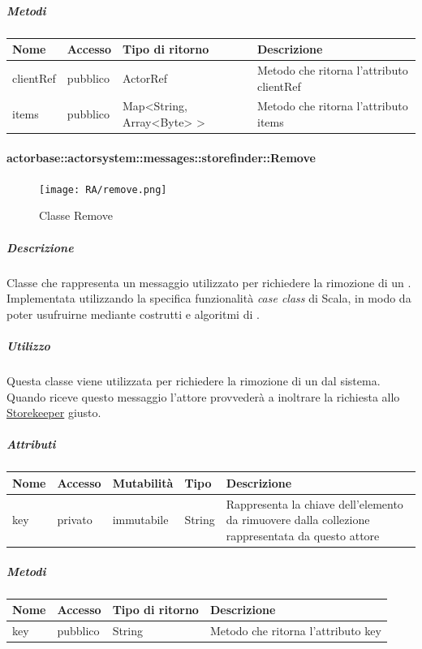 \documentclass{scalatekids-article}
\begin{document}
\subparagraph{Metodi}
\begin{tabular}{| p{3cm} | p{1.5cm} | p{3.5cm} | p{9cm} |}
  \hline
  Nome & Accesso & Tipo di ritorno & Descrizione\\
  \hline
  clientRef & pubblico & ActorRef & Metodo che ritorna l'attributo clientRef\\
  \hline
  items & pubblico & Map<String, Array<Byte> > & Metodo che ritorna l'attributo items\\
  \hline
\end{tabular}

\paragraph{actorbase::actorsystem::messages::storefinder::Remove}
\label{sec:actorbase::actorsystem::messages::storefinder::Remove}

\begin{figure}[H]
  \begin{center}
    \texttt{[image: RA/remove.png]}
    \caption{Classe Remove}
  \end{center}
\end{figure}

\subparagraph{Descrizione}
Classe che rappresenta un messaggio utilizzato per richiedere la rimozione di un
.\\Implementata utilizzando la specifica funzionalità \textit{case
  class} di Scala, in modo da poter usufruirne mediante costrutti e algoritmi di
.

\subparagraph{Utilizzo}
Questa classe viene utilizzata per richiedere la rimozione di un  dal
sistema.\\Quando riceve questo messaggio l'attore provvederà a inoltrare la
richiesta allo \hyperref[sec:actorbase::actorsystem::actors::storekeeper::Storekeeper]{Storekeeper}
giusto.

\subparagraph{Attributi}
\begin{tabular}{| p{2cm} | p{1.5cm} | p{2cm} | p{3cm} | p{8.5cm} |}
  \hline
  Nome & Accesso & Mutabilità & Tipo & Descrizione\\
  \hline
  key & privato & immutabile & String & Rappresenta la chiave dell'elemento da rimuovere dalla collezione rappresentata da questo attore\\
  \hline
\end{tabular}

\subparagraph{Metodi}
\begin{tabular}{| p{3cm} | p{1.5cm} | p{3.5cm} | p{9cm} |}
  \hline
  Nome & Accesso & Tipo di ritorno & Descrizione\\
  \hline
  key & pubblico & String & Metodo che ritorna l'attributo key\\
  \hline
\end{tabular}
\end{document}
